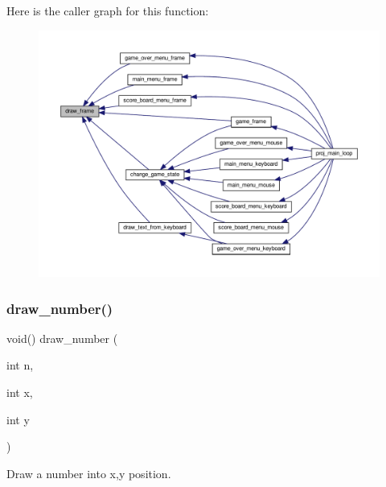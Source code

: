 Here is the caller graph for this function\+:\nopagebreak
\begin{figure}[H]
\begin{center}
\leavevmode
\includegraphics[width=350pt]{group__graphics_gae70314d2e6e41dae20ce327a13929401_icgraph}
\end{center}
\end{figure}
\mbox{\label{group__graphics_ga7b24da519204bf650a1e98c993093e94}} 
\subsubsection{\texorpdfstring{draw\+\_\+number()}{draw\_number()}}
{\footnotesize\ttfamily void() draw\+\_\+number (\begin{DoxyParamCaption}\item[{int}]{n,  }\item[{int}]{x,  }\item[{int}]{y }\end{DoxyParamCaption})}



Draw a number into x,y position. 

